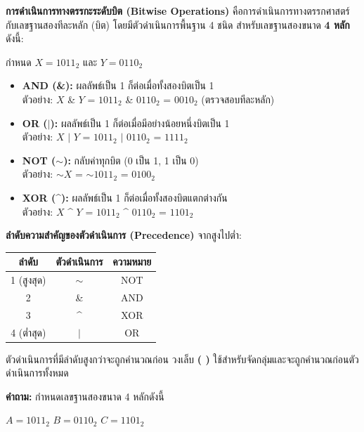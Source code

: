 \question \textbf{การดำเนินการทางตรรกะระดับบิต (Bitwise Operations)} คือการดำเนินการทางตรรกศาสตร์กับเลขฐานสองทีละหลัก (บิต) โดยมีตัวดำเนินการพื้นฐาน 4 ชนิด สำหรับเลขฐานสองขนาด \textbf{4 หลัก} ดังนี้:

\medskip
\noindent
กำหนด $X = 1011_2$ และ $Y = 0110_2$

\begin{itemize}
  \item \textbf{AND (\&):} ผลลัพธ์เป็น 1 ก็ต่อเมื่อทั้งสองบิตเป็น 1 \\
        ตัวอย่าง: $X$ \& $Y$ = $1011_2$ \& $0110_2$ = $0010_2$ \quad (ตรวจสอบทีละหลัก)

  \item \textbf{OR ($|$):} ผลลัพธ์เป็น 1 ก็ต่อเมื่อมีอย่างน้อยหนึ่งบิตเป็น 1 \\
        ตัวอย่าง: $X$ $|$ $Y$ = $1011_2$ $|$ $0110_2$ = $1111_2$

  \item \textbf{NOT ($\sim$):} กลับค่าทุกบิต (0 เป็น 1, 1 เป็น 0) \\
        ตัวอย่าง: $\sim X$ = $\sim 1011_2$ = $0100_2$

  \item \textbf{XOR (\textasciicircum):} ผลลัพธ์เป็น 1 ก็ต่อเมื่อทั้งสองบิตแตกต่างกัน \\
        ตัวอย่าง: $X$ \textasciicircum{} $Y$ = $1011_2$ \textasciicircum{} $0110_2$ = $1101_2$
\end{itemize}

\medskip
\textbf{ลำดับความสำคัญของตัวดำเนินการ (Precedence)} จากสูงไปต่ำ:

\begin{center}
\begin{tabular}{|c|c|c|}
\hline
\textbf{ลำดับ} & \textbf{ตัวดำเนินการ} & \textbf{ความหมาย} \\
\hline
1 (สูงสุด) & $\sim$ & NOT \\
2 & \& & AND \\
3 & \textasciicircum & XOR \\
4 (ต่ำสุด) & $|$ & OR \\
\hline
\end{tabular}
\end{center}

ตัวดำเนินการที่มีลำดับสูงกว่าจะถูกคำนวณก่อน วงเล็บ \textbf{( )} ใช้สำหรับจัดกลุ่มและจะถูกคำนวณก่อนตัวดำเนินการทั้งหมด

\medskip
\textbf{คำถาม:} กำหนดเลขฐานสองขนาด 4 หลักดังนี้

\begin{center}
$A = 1011_2$ \qquad $B = 0110_2$ \qquad $C = 1101_2$
\end{center}

